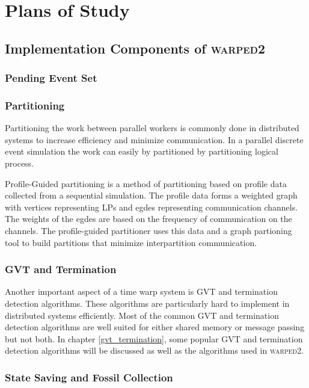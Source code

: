 \documentclass[11pt]{book}
\begin{document}
\chapter{Plans of Study}\label{plans_of_study}

\section{Implementation Components of \textsc{warped2}}

\subsection{Pending Event Set}



\subsection{Partitioning}

Partitioning the work between parallel workers is commonly done in distributed systems
to increase efficiency and minimize communication. In a parallel discrete event simulation
the work can easily by partitioned by partitioning logical process. 

Profile-Guided partitioning is a method of partitioning based on profile data collected
from a sequential simulation. The profile data forms a weighted graph with vertices
representing LPs and egdes representing communication channels. The weights of the egdes
are based on the frequency of communication on the channels. The profile-guided partitioner
uses this data and a graph partioning tool to build partitions that minimize interpartition
communication.

\subsection{GVT and Termination}

Another important aspect of a time warp system is GVT and termination detection algorithms.
These algorithms are particularly hard to implement in distributed systems efficiently.
Most of the common GVT and termination detection algorithms are well suited for either
shared memory or message passing but not both. In chapter \ref{gvt_termination}, some
popular GVT and termination detection algorithms will be discussed as well as the algorithms
used in \textsc{warped2}.

\subsection{State Saving and Fossil Collection}
\end{document}
